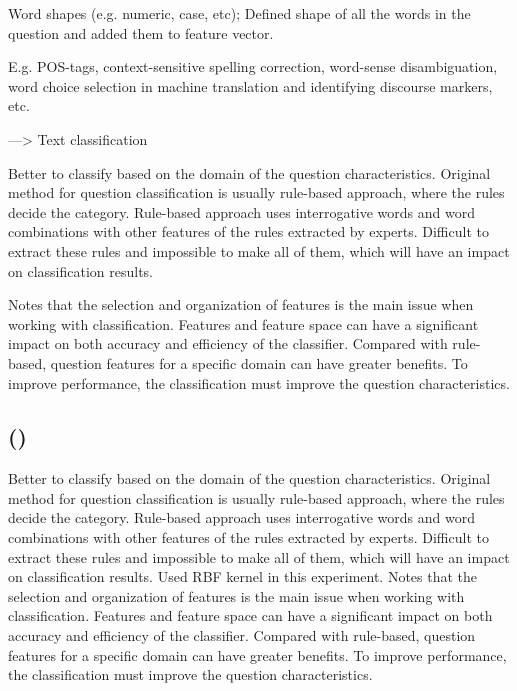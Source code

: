 Word shapes (e.g. numeric, case, etc); Defined shape of all the words in the question and added them to feature vector. 
 \cite{Loni2011}
 
E.g. POS-tags, context-sensitive spelling correction, word-sense disambiguation, word choice selection in machine translation and identifying discourse markers, etc. \cite{Li, Heie2012}
 
---> Text classification \cite{Kaestner2013}



\textcite{Xu2012}

Better to classify based on the domain of the question characteristics. 
Original method for question classification is usually rule-based approach, where the rules decide the category. 
Rule-based approach uses interrogative words and word combinations with other features of the rules extracted by experts. 
Difficult to extract these rules and impossible to make all of them, which will have an impact on classification results. 

Notes that the selection and organization of features is the main issue when working with classification. 
Features and feature space can have a significant impact on both accuracy and efficiency of the classifier. 
Compared with rule-based, question features for a specific domain can have greater benefits. 
To improve performance, the classification must improve the question characteristics. 
\cite{Xu2012}



\subsection[Question-Answering]{ ()}
\label{sec:question_answering}


Better to classify based on the domain of the question characteristics. 
Original method for question classification is usually rule-based approach, where the rules decide the category. 
Rule-based approach uses interrogative words and word combinations with other features of the rules extracted by experts. 
Difficult to extract these rules and impossible to make all of them, which will have an impact on classification results. 
Used RBF kernel in this experiment. 
Notes that the selection and organization of features is the main issue when working with classification. 
Features and feature space can have a significant impact on both accuracy and efficiency of the classifier. 
Compared with rule-based, question features for a specific domain can have greater benefits. 
To improve performance, the classification must improve the question characteristics. 
\cite{Xu2012}

